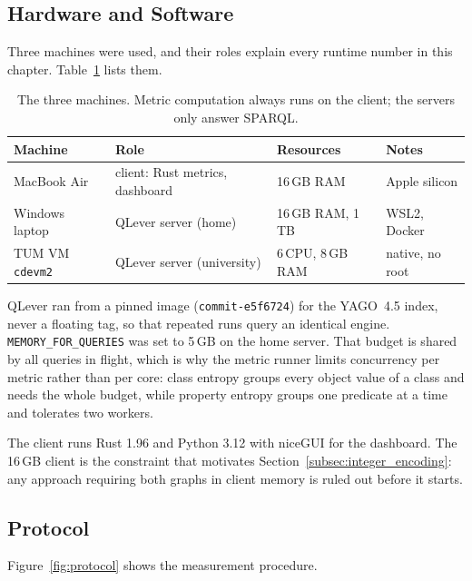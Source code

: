 \subsection{Hardware and Software}
\label{subsec:hardware_software}

Three machines were used, and their roles explain every runtime number in this
chapter. Table~\ref{tab:machines} lists them.

\begin{table}[htbp]
  \centering
  \caption[]{The three machines. Metric computation always runs on
    the client; the servers only answer SPARQL.}
  \label{tab:machines}
  \footnotesize
  \begin{tabular}{llll}
    \toprule
    Machine & Role & Resources & Notes \\
    \midrule
    MacBook Air        & client: Rust metrics, dashboard & 16\,GB RAM & Apple silicon \\
    Windows laptop     & QLever server (home)            & 16\,GB RAM, 1\,TB & WSL2, Docker \\
    TUM VM \texttt{cdevm2} & QLever server (university)  & 6\,CPU, 8\,GB RAM & native, no root \\
    \bottomrule
  \end{tabular}
\end{table}

QLever ran from a pinned image (\texttt{commit-e5f6724}) for the YAGO~4.5 index,
never a floating tag, so that repeated runs query an identical engine.
\texttt{MEMORY\_FOR\_QUERIES} was set to 5\,GB on the home server. That budget is
shared by all queries in flight, which is why the metric runner limits
concurrency per metric rather than per core: class entropy groups every object
value of a class and needs the whole budget, while property entropy groups one
predicate at a time and tolerates two workers.

The client runs Rust 1.96 and Python 3.12 with niceGUI for the dashboard. The
16\,GB client is the constraint that motivates
Section~\ref{subsec:integer_encoding}: any approach requiring both graphs in client
memory is ruled out before it starts.

\subsection{Protocol}
\label{subsec:protocol}

Figure~\ref{fig:protocol} shows the measurement procedure.

